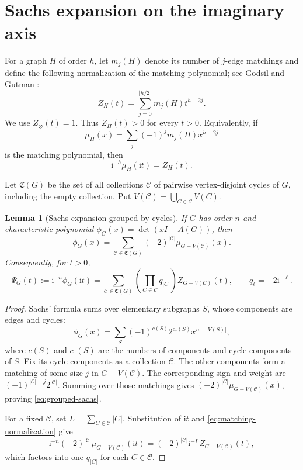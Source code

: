 \documentclass[11pt]{article}
\newtheorem{lemma}[theorem]{Lemma}
\theoremstyle{definition}
\theoremstyle{remark}
\newcommand{\ii}{\mathrm{i}}
\newcommand{\cC}{\mathcal C}
\begin{document}
\section{Sachs expansion on the imaginary axis}\label{sec:proof}

For a graph $H$ of order $h$, let $m_j(H)$ denote its number of
$j$-edge matchings and define the following normalization of the matching
polynomial; see Godsil and Gutman \cite{GodsilGutman}:
\begin{equation}\label{eq:Z}
 Z_H(t)=\sum_{j=0}^{\lfloor h/2\rfloor}m_j(H)t^{h-2j}.
\end{equation}
We use $Z_{\varnothing}(t)=1$.  Thus $Z_H(t)>0$ for every $t>0$.
Equivalently, if
\[
 \mu_H(x)=\sum_j(-1)^jm_j(H)x^{h-2j}
\]
is the matching polynomial, then
\begin{equation}\label{eq:matching-normalization}
 \ii^{-h}\mu_H(\ii t)=Z_H(t).
\end{equation}

Let $\mathfrak C(G)$ be the set of all collections $\cC$ of pairwise
vertex-disjoint cycles of $G$, including the empty collection.  Put
$V(\cC)=\bigcup_{C\in\cC}V(C)$.

\begin{lemma}[Sachs expansion grouped by cycles]\label{lem:sachs}
If $G$ has order $n$ and characteristic polynomial
$\phi_G(x)=\det(xI-A(G))$, then
\begin{equation}\label{eq:grouped-sachs}
 \phi_G(x)=
 \sum_{\cC\in\mathfrak C(G)}(-2)^{|\cC|}
 \mu_{G-V(\cC)}(x).
\end{equation}
Consequently, for $t>0$,
\begin{equation}\label{eq:Psi-expansion}
 \Psi_G(t):=\ii^{-n}\phi_G(\ii t)
 =\sum_{\cC\in\mathfrak C(G)}
   \left(\prod_{C\in\cC}q_{|C|}\right)
   Z_{G-V(\cC)}(t),
 \qquad q_\ell=-2\ii^{-\ell}.
\end{equation}
\end{lemma}

\begin{proof}
Sachs' formula \cite{Sachs} sums over elementary subgraphs $S$, whose
components are edges and cycles:
\[
 \phi_G(x)=\sum_S(-1)^{c(S)}2^{c_\circ(S)}x^{n-|V(S)|},
\]
where $c(S)$ and $c_\circ(S)$ are the numbers of components and cycle
components of $S$.  Fix its cycle components as a collection $\cC$.
The other components form a matching of some size $j$ in
$G-V(\cC)$.  The corresponding sign and weight are
$(-1)^{|\cC|+j}2^{|\cC|}$.  Summing over those matchings gives
$(-2)^{|\cC|}\mu_{G-V(\cC)}(x)$, proving
\eqref{eq:grouped-sachs}.

For a fixed $\cC$, set $L=\sum_{C\in\cC}|C|$.  Substitution of $\ii t$
and \eqref{eq:matching-normalization} give
\[
 \ii^{-n}(-2)^{|\cC|}\mu_{G-V(\cC)}(\ii t)
 =(-2)^{|\cC|}\ii^{-L}Z_{G-V(\cC)}(t),
\]
which factors into one $q_{|C|}$ for each $C\in\cC$.
\end{proof}
\end{document}
